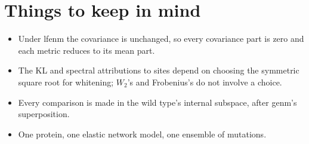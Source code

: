 \documentclass[11pt]{article}
\begin{document}
\section{Things to keep in mind}

\begin{itemize}
\item Under lfenm the covariance is unchanged, so every covariance part is zero and each metric reduces
  to its mean part.
\item The KL and spectral attributions to sites depend on choosing the symmetric square root for whitening;
  $W_2$'s and Frobenius's do not involve a choice.
\item Every comparison is made in the wild type's internal subspace, after genm's superposition.
\item One protein, one elastic network model, one ensemble of mutations.
\end{itemize}
\end{document}
